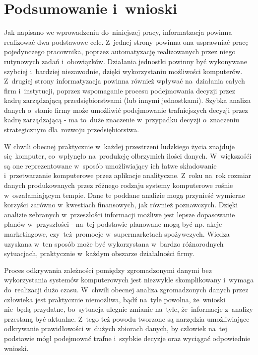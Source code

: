 \chapter{Podsumowanie i~wnioski\label{chap:zakonczenie}}

Jak napisano we wprowadzeniu do~niniejszej pracy, informatzacja powinna realizować dwa podstawowe cele. Z~jednej strony powinna ona usprawniać pracę pojedynczego pracownika, poprzez automatyzację realizowanych przez niego rutynowych zadań i~obowiązków. Działania jednostki powinny być wykonywane szybciej i~bardziej niezawodnie, dzięki wykorzystaniu możliwości komputerów. Z~drugiej strony informatyzacja powinna również wpływać na~działania całych firm i~instytucji, poprzez wspomaganie procesu podejmowania decyzji przez kadrę zarządzającą przedsiębiorstwami (lub innymi jednostkami). Szybka analiza danych o~stanie firmy może umożliwić podejmowanie trafniejszych decyzji przez kadrę zarządzającą - ma to~duże znaczenie w~przypadku decyzji o~znaczeniu strategicznym dla~rozwoju przedsiębiorstwa.

W chwili obecnej praktycznie w~każdej przestrzeni ludzkiego życia znajduje się~komputer, co~wpłynęło na~produkcję olbrzymich ilości danych. W~większośći są one reprezentowane w~sposób umożliwiający ich łatwe składowanie i~przetwarzanie komputerowe przez aplikacje analityczne. Z~roku na~rok rozmiar danych produkowanych przez różnego rodzaju systemy komputerowe rośnie w~oszałamiającym tempie. Dane te poddane analizie mogą przynieść wymierne korzyści zarówno w~kwestiach finansowych, jak również poznawczych. Dzięki analizie zebranych w~przeszłości informacji możliwe jest lepsze dopasowanie planów w~przyszłości - na~tej podstawie planowane mogą być np. akcje marketingowe, czy~też~promocje w~supermarketach spożywczych. Wiedza uzyskana w~ten sposób może być wykorzystana w~bardzo różnorodnych sytuacjach, praktycznie w~każdym obszarze działalności firmy.

Proces odkrywania zależności pomiędzy zgromadzonymi danymi bez wykorzystania systemów komputerowych jest niezwykle skomplikowany i~wymaga do~realizacji dużo czasu. W~chwili obecnej analiza zgromadzonych danych przez człowieka jest praktycznie niemożliwa, bądź na~tyle powolna, że~wnioski nie~będą przydatne, bo~sytuacja ulegnie zmianie na~tyle, że~informacje z~analizy przestaną być aktualne. Z~tego też powodu tworzone są narzędzia umożliwiające odkrywanie prawidłowości w~dużych zbiorach danych, by człowiek na~tej podstawie mógł podejmować trafne i~szybkie decyzje oraz wyciągać odpowiednie wnioski.


